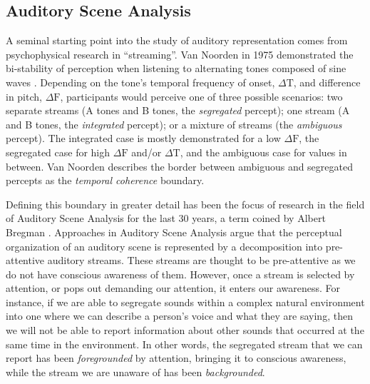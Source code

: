 \documentclass[a4paper,10pt,final]{ThesisStyle}
\begin{document}
\subsection{Auditory Scene Analysis}

A seminal starting point into the study of auditory representation comes from psychophysical research in ``streaming''.  Van Noorden in 1975 demonstrated the bi-stability of perception when listening to alternating tones composed of sine waves \cite{Noorden1975}.  Depending on the tone's temporal frequency of onset, $\Delta \text{T}$, and difference in pitch, $\Delta \text{F}$, participants would perceive one of three possible scenarios: two separate streams (A tones and B tones, the \textit{segregated} percept); one stream (A and B tones, the \textit{integrated} percept); or a mixture of streams (the \textit{ambiguous} percept).  The integrated case is mostly demonstrated for a low $\Delta \text{F}$, the segregated case for high $\Delta \text{F}$ and/or $\Delta \text{T}$, and the ambiguous case for values in between.  Van Noorden describes the border between ambiguous and segregated percepts as the \textit{temporal coherence} boundary.  

Defining this boundary in greater detail has been the focus of research in the field of Auditory Scene Analysis for the last 30 years, a term coined by Albert Bregman \cite{Bregman1990}.  Approaches in Auditory Scene Analysis argue that the perceptual organization of an auditory scene is represented by a decomposition into pre-attentive auditory streams.  These streams are thought to be pre-attentive as we do not have conscious awareness of them.  However, once a stream is selected by attention, or pops out demanding our attention, it enters our awareness.  For instance, if we are able to segregate sounds within a complex natural environment into one where we can describe a person's voice and what they are saying, then we will not be able to report information about other sounds that occurred at the same time in the environment.  In other words, the segregated stream that we can report has been \textit{foregrounded} by attention, bringing it to conscious awareness, while the stream we are unaware of has been \textit{backgrounded}.  
\end{document}
